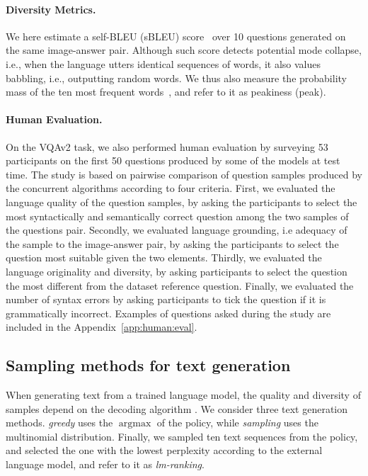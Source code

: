 \documentclass{article}
\DeclareMathOperator*{\argmax}{argmax}
\begin{document}
\paragraph{Diversity Metrics.} 
We here estimate a self-BLEU (sBLEU) score~\citep{zhang2017adversarial} over 10 questions generated on the same image-answer pair.
Although such score detects potential mode collapse, i.e., when the language utters identical sequences of words, it also values babbling, i.e., outputting random words. We thus also measure the probability mass of the ten most frequent words~\citep{choshen2020weaknesses}, and refer to it as peakiness (peak).

\paragraph{Human Evaluation.} On the VQAv2 task, we also performed human evaluation by surveying 53 participants on the first 50 questions produced by some of the models at test time. 
The study is based on pairwise comparison of question samples produced by the concurrent algorithms according to four criteria. First, we evaluated the language quality of the question samples, by asking the participants to select the most syntactically and semantically correct question among the two samples of the questions pair. Secondly, we evaluated language grounding, i.e adequacy of the sample to the image-answer pair, by asking the participants to select the question most suitable given the two elements. Thirdly, we evaluated the language originality and diversity, by asking participants to select the question the most different from the dataset reference question. Finally, we evaluated the number of syntax errors by asking participants to tick the question if it is grammatically incorrect.  Examples of questions asked during the study are included in the Appendix~\ref{app:human:eval}.

\subsection{Sampling methods for text generation}
\label{subsec:decoding:methods}

When generating text from a trained language model, the quality and diversity of samples depend on the decoding algorithm \citep{zhang2020trading}. We consider three text generation methods. \textit{greedy} uses the $\argmax$ of the policy, while \textit{sampling} uses the multinomial distribution. Finally, we sampled ten text sequences from the policy, and selected the one with the lowest perplexity according to the external language model, and refer to it as \textit{lm-ranking}. 
\end{document}
